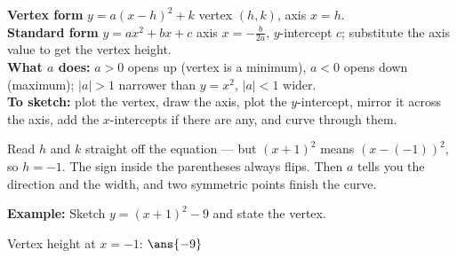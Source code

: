 \documentclass[12pt]{article}
\begin{document}

\begin{formulabox}
\textbf{Vertex form} $y = a(x-h)^2 + k$ \quad vertex $(h,k)$, axis $x = h$.\\[2pt]
\textbf{Standard form} $y = ax^2 + bx + c$ \quad axis $x = -\frac{b}{2a}$,
$y$-intercept $c$; substitute the axis value to get the vertex height.\\[3pt]
\textbf{What $a$ does:} $a > 0$ opens up (vertex is a minimum), $a < 0$ opens
down (maximum); $|a| > 1$ narrower than $y = x^2$, $|a| < 1$ wider.\\[3pt]
\textbf{To sketch:} plot the vertex, draw the axis, plot the $y$-intercept,
mirror it across the axis, add the $x$-intercepts if there are any, and curve
through them.
\end{formulabox}


\begin{formulabox}
Read $h$ and $k$ straight off the equation --- but $(x+1)^2$ means
$(x-(-1))^2$, so $h = -1$. The sign inside the parentheses always flips. Then
$a$ tells you the direction and the width, and two symmetric points finish the
curve.
\end{formulabox}

\begin{examplebox}
\textbf{Example:} Sketch $y = (x+1)^2 - 9$ and state the vertex.
\begin{center}
\end{center}
Vertex height at $x = -1$: $\ans{-9}$
\end{examplebox}
\end{document}
